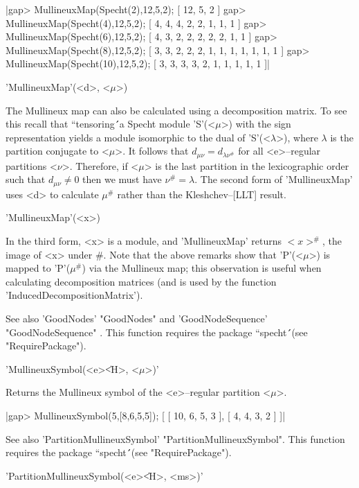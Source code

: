 |gap> MullineuxMap(Specht(2),12,5,2); 
[ 12, 5, 2 ]
gap> MullineuxMap(Specht(4),12,5,2);
[ 4, 4, 4, 2, 2, 1, 1, 1 ]
gap> MullineuxMap(Specht(6),12,5,2);
[ 4, 3, 2, 2, 2, 2, 2, 1, 1 ]
gap> MullineuxMap(Specht(8),12,5,2);
[ 3, 3, 2, 2, 2, 1, 1, 1, 1, 1, 1, 1 ]
gap> MullineuxMap(Specht(10),12,5,2);
[ 3, 3, 3, 3, 2, 1, 1, 1, 1, 1 ]|

'MullineuxMap'(<d>, <$\mu$>)

The Mullineux map can also be calculated using a decomposition matrix.
To see this recall that ``tensoring\'\'\ a Specht module 'S'(<$\mu$>) with
the sign representation yields a module isomorphic to the dual of
'S'(<$\lambda$>), where $\lambda$ is the partition conjugate to <$\mu$>. 
It follows that $d_{\mu\nu}=d_{\lambda\nu^\#}$ for all <e>--regular 
partitions <$\nu$>. Therefore, if <$\mu$> is the last partition in the 
lexicographic order such that $d_{\mu\nu}\ne0$ then we must have 
$\nu^\#=\lambda$. The second form of 'MullineuxMap' uses <d> to calculate 
$\mu^\#$ rather than the Kleshchev--[LLT] result.

'MullineuxMap'(<x>)

In the third form, <x> is a module, and 'MullineuxMap' returns $<x>^\#$, the
image of <x> under \#. Note that the above remarks show that 'P'(<$\mu$>) 
is mapped to 'P'($\mu^\#$) via the Mullineux map; this observation is 
useful when calculating decomposition matrices (and is used by the
function 'InducedDecompositionMatrix').

See also 'GoodNodes' "GoodNodes" and 'GoodNodeSequence' 
"GoodNodeSequence" .  This function requires the package ``specht\'\'\ 
(see "RequirePackage").



'MullineuxSymbol(<e>\|<H>, <$\mu$>)'

Returns the Mullineux symbol of the <e>--regular partition <$\mu$>.

|gap> MullineuxSymbol(5,[8,6,5,5]);
[ [ 10, 6, 5, 3 ], [ 4, 4, 3, 2 ] ]|

See also 'PartitionMullineuxSymbol' "PartitionMullineuxSymbol". This function 
requires the package ``specht\'\'\ (see "RequirePackage").



'PartitionMullineuxSymbol(<e>\|<H>, <ms>)'

